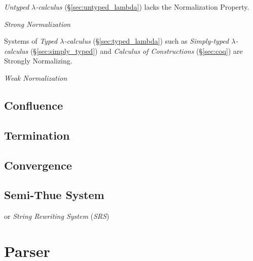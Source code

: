 \emph{Untyped $\lambda$-calculus} (\S\ref{sec:untyped_lambda}) lacks
the Normalization Property.

\emph{Strong Normalization}

Systems of \emph{Typed $\lambda$-calculus} (\S\ref{sec:typed_lambda})
such as \emph{Simply-typed $\lambda$-calculus}
(\S\ref{sec:simply_typed}) and \emph{Calculus of Constructions}
(\S\ref{sec:coq}) are Strongly Normalizing.

\emph{Weak Normalization}



\subsection{Confluence}\label{sec:rewrite_confluence}

\subsection{Termination}\label{sec:rewrite_termination}

\subsection{Convergence}\label{sec:rewrite_convergence}

\subsection{Semi-Thue System}\label{sec:semithue_system}

or \emph{String Rewriting System} (\emph{SRS})



\section{Parser} \label{sec:parser}


